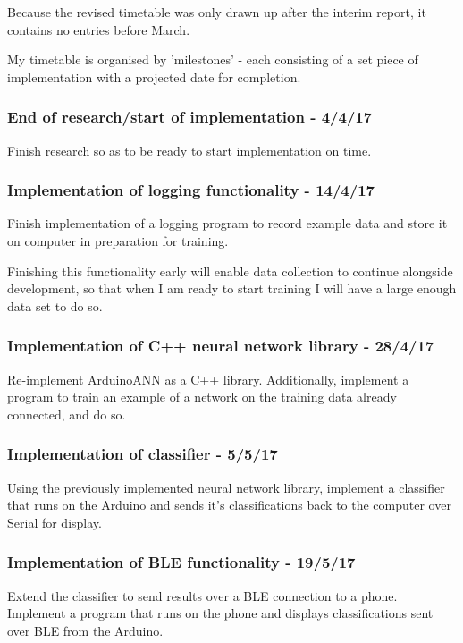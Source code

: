 \documentclass[a4paper]{article}
\begin{document}
Because the revised timetable was only drawn up after the interim report, it contains no entries before March.

My timetable is organised by 'milestones' - each consisting of a set piece of implementation with a projected date for completion.

\subsubsection{End of research/start of implementation - 4/4/17}

Finish research so as to be ready to start implementation on time.

\subsubsection{Implementation of logging functionality - 14/4/17}

Finish implementation of a logging program to record example data and store it on computer in preparation for training.

Finishing this functionality early will enable data collection to continue alongside development, so that when I am ready to start training I will have a large enough data set to do so.

\subsubsection{Implementation of C++ neural network library - 28/4/17}

Re-implement ArduinoANN as a C++ library. Additionally, implement a program to train an example of a network on the training data already connected, and do so.

\subsubsection{Implementation of classifier - 5/5/17}

Using the previously implemented neural network library, implement a classifier that runs on the Arduino and sends it's classifications back to the computer over Serial for display.

\subsubsection{Implementation of BLE functionality - 19/5/17}

Extend the classifier to send results over a BLE connection to a phone. Implement a program that runs on the phone and displays classifications sent over BLE from the Arduino.
\end{document}
